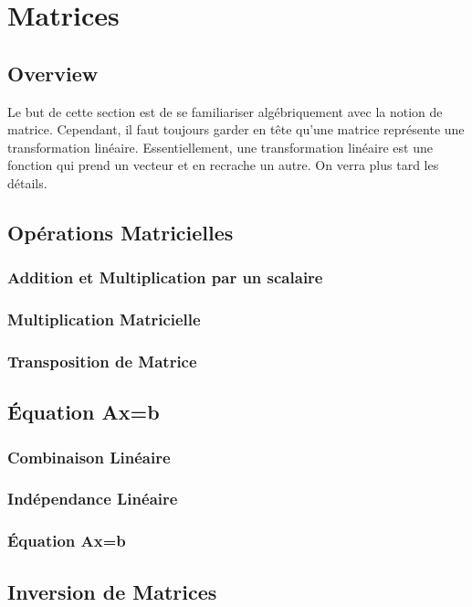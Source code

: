 \documentclass{article}
\begin{document}
\begin{remark}
\end{remark}

\pagebreak

\section{Matrices}
\subsection{Overview}

Le but de cette section est de se familiariser algébriquement avec la notion de
matrice. Cependant, il faut toujours garder en tête qu'une matrice représente
une transformation linéaire. Essentiellement, une transformation linéaire est
une fonction qui prend un vecteur et en recrache un autre. On verra plus tard
les détails.

\subsection{Opérations Matricielles}
\subsubsection{Addition et Multiplication par un scalaire}
\subsubsection{Multiplication Matricielle}
\subsubsection{Transposition de Matrice}
\subsection{Équation Ax=b}
\subsubsection{Combinaison Linéaire}
\subsubsection{Indépendance Linéaire}
\subsubsection{Équation Ax=b}
\subsection{Inversion de Matrices}
\end{document}
